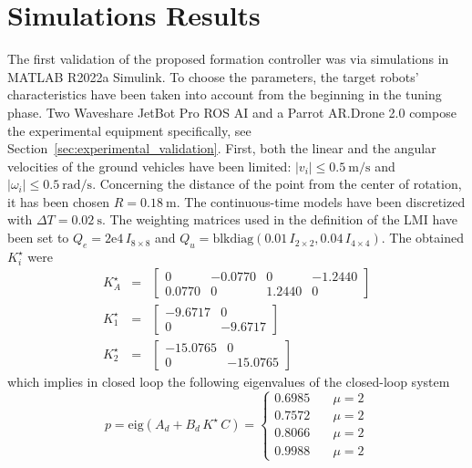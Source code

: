 \documentclass{ifacconf}
\begin{document}
\section{Simulations Results}
\label{sec:simulation_results}
The first validation of the proposed formation 
controller was via simulations in MATLAB R2022a Simulink.
To choose the parameters, the target robots' characteristics 
have been taken into account from the beginning 
in the tuning phase.
Two Waveshare JetBot Pro ROS AI and a Parrot AR.Drone 2.0 
compose the experimental equipment specifically, 
see Section~\ref{sec:experimental_validation}.
First, both the linear and the angular velocities 
of the ground vehicles have been limited: 
$\left\lvert v_i \right\rvert \leq \SI{0.5}{\meter\per\second}$ and 
$\left\lvert \omega_i\right\rvert \leq \SI{0.5}{\radian\per\second}$.
Concerning the distance of the point from the center of rotation, 
it has been chosen $R = \SI{0.18}{\meter}$.
The continuous-time models have been 
discretized with
$\Delta T = \SI{0.02}{\second}$.
The weighting matrices used in the definition 
of the LMI have been set to 
$Q_e = 2\mathrm{e}4 \, I_{8 \times 8}$ and 
$Q_u =\text{blkdiag}(0.01 \, I_{2\times2}, 0.04 \, I_{4\times4})$.
The obtained $K^\star_i$ were 
\begin{eqnarray}
    K^\star_A &=& \begin{bmatrix}
        0  &  -0.0770    &     0  &  -1.2440 \\
        0.0770 &     0       & 1.2440 &      0
    \end{bmatrix}\\
    K^\star_1 &=& \begin{bmatrix}
        -9.6717 & 0 \\
         0   & -9.6717
    \end{bmatrix}\\
    K^\star_2 &=& \begin{bmatrix}
        -15.0765 & 0 \\
         0   & -15.0765
    \end{bmatrix}
\end{eqnarray}
which implies in closed loop the following 
eigenvalues of the closed-loop system
\begin{equation}
    p = \text{eig}(A_d + B_d \, K^\star \, C) = 
    \begin{cases}
        0.6985 \quad & \mu = 2\\
        0.7572 \quad & \mu = 2\\
        0.8066 \quad & \mu = 2\\
        0.9988 \quad  &   \mu = 2
    \end{cases}
\end{equation}
\end{document}
